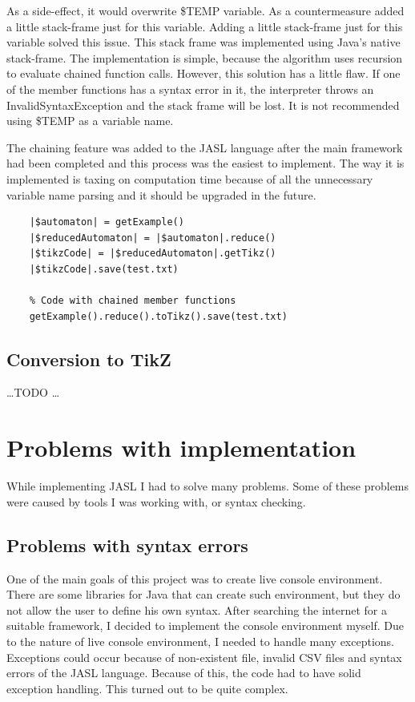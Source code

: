\documentclass{ctuthesis}
\begin{document}
As a side-effect, it would overwrite \$TEMP variable. As a countermeasure added a little stack-frame just for this variable. Adding a little stack-frame just for this variable solved this issue. This stack frame was implemented using Java's native stack-frame. The implementation is simple, because the algorithm uses recursion to evaluate chained function calls. However, this solution has a little flaw. If one of the member functions has a syntax error in it, the interpreter throws an InvalidSyntaxException and the stack frame will be lost. It is not recommended using \$TEMP as a variable name. 

The chaining feature was added to the JASL language after the main framework had been completed and this process was the easiest to implement. The way it is implemented is taxing on computation time because of all the unnecessary variable name parsing and it should be upgraded in the future. 

\begin{minipage}{\linewidth}
\begin{lstlisting}[language = JASL]
	% Code without chained member function calls
	|$automaton| = getExample()
	|$reducedAutomaton| = |$automaton|.reduce()
	|$tikzCode| = |$reducedAutomaton|.getTikz()
	|$tikzCode|.save(test.txt)
	
	% Code with chained member functions
	getExample().reduce().toTikz().save(test.txt)
\end{lstlisting}
\end{minipage}

\subsection{Conversion to TikZ}
\ldots TODO \ldots

\section{Problems with implementation}
While implementing JASL I had to solve many problems. Some of these problems were caused by tools I was working with, or syntax checking. 

\subsection{Problems with syntax errors}
One of the main goals of this project was to create live console environment. There are some libraries for Java that can create such environment, but they do not allow the user to define his own syntax. After searching the internet for a suitable framework, I decided to implement the console environment myself. Due to the nature of live console environment, I needed to handle many exceptions. Exceptions could occur because of non-existent file, invalid CSV files and syntax errors of the JASL language. Because of this, the code had to have solid exception handling. This turned out to be quite complex.
\end{document}
